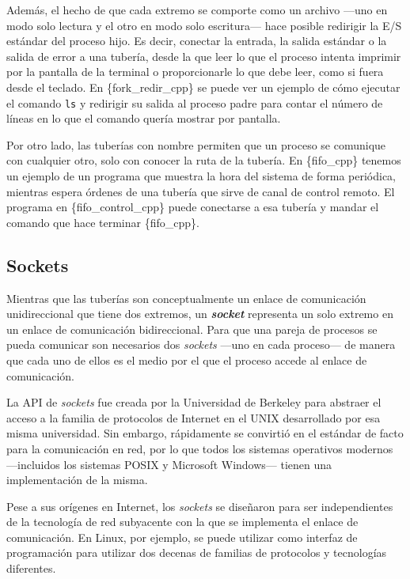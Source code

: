 Además, el hecho de que cada extremo se comporte como un archivo ---uno
en modo solo lectura y el otro en modo solo escritura--- hace posible
redirigir la E/S estándar del proceso hijo. Es decir, conectar la
entrada, la salida estándar o la salida de error a una tubería, desde la
que leer lo que el proceso intenta imprimir por la pantalla de la
terminal o proporcionarle lo que debe leer, como si fuera desde el
teclado. En \{fork\_redir\_cpp\} se puede ver un ejemplo de cómo
ejecutar el comando \texttt{ls} y redirigir su salida al proceso padre
para contar el número de líneas en lo que el comando quería mostrar por
pantalla.

Por otro lado, las tuberías con nombre permiten que un proceso se
comunique con cualquier otro, solo con conocer la ruta de la tubería. En
\{fifo\_cpp\} tenemos un ejemplo de un programa que muestra la hora del
sistema de forma periódica, mientras espera órdenes de una tubería que
sirve de canal de control remoto. El programa en \{fifo\_control\_cpp\}
puede conectarse a esa tubería y mandar el comando que hace terminar
\{fifo\_cpp\}.

\subsection{Sockets}\label{_sockets}

Mientras que las tuberías son conceptualmente un enlace de comunicación
unidireccional que tiene dos extremos, un \textbf{\emph{{}socket}}
representa un solo extremo en un enlace de comunicación bidireccional.
Para que una pareja de procesos se pueda comunicar son necesarios dos
\emph{sockets} ---uno en cada proceso--- de manera que cada uno de ellos
es el medio por el que el proceso accede al enlace de comunicación.

La API de \emph{sockets} fue creada por la Universidad de Berkeley para
abstraer el acceso a la familia de protocolos de Internet en el UNIX
desarrollado por esa misma universidad. Sin embargo, rápidamente se
convirtió en el estándar de facto para la comunicación en red, por lo
que todos los sistemas operativos modernos ---incluidos los sistemas
POSIX y Microsoft Windows--- tienen una implementación de la misma.

Pese a sus orígenes en Internet, los \emph{sockets} se diseñaron para
ser independientes de la tecnología de red subyacente con la que se
implementa el enlace de comunicación. En Linux, por ejemplo, se puede
utilizar como interfaz de programación para utilizar dos decenas de
familias de protocolos y tecnologías diferentes.

